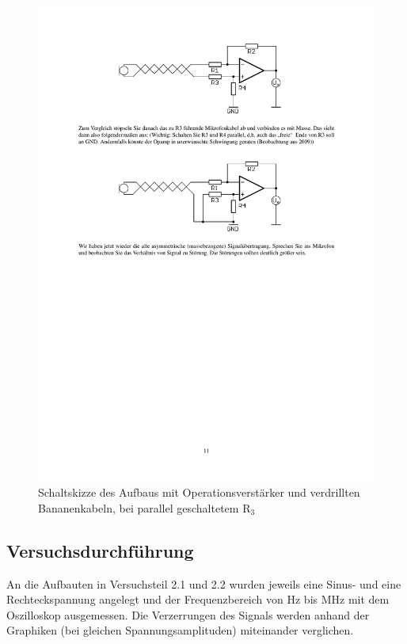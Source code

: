 \documentclass[12pt,a4paper]{article}
\begin{document}
\begin{figure}[H] 
  \centering
    \includegraphics[trim = 10mm 160mm 10mm 90mm, clip, scale = 1]{2_3+Op-Amp.pdf}
  	\caption[Schaltskizze des Aufbaus mit Operationsverstärker und verdrillten Bananenkabeln, bei parallel geschaltetem R$_3$]{Schaltskizze des Aufbaus mit Operationsverstärker und verdrillten Bananenkabeln, bei parallel geschaltetem R$_3$\footnotemark}
  \label{fig:2.5}
\end{figure}


\subsection{Versuchsdurchführung}
An die Aufbauten in Versuchsteil 2.1 und 2.2 wurden jeweils eine Sinus- und eine Rechteckspannung angelegt und der Frequenzbereich von \unit[100]{Hz} bis \unit[10]{MHz} mit dem Oszilloskop ausgemessen. Die Verzerrungen des Signals werden anhand der Graphiken (bei gleichen Spannungsamplituden) miteinander verglichen.
\end{document}
